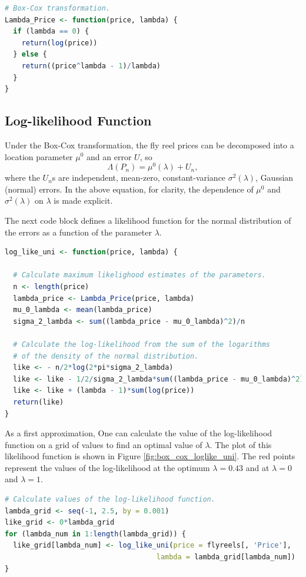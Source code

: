 \vspace{1.0in}

\begin{lstlisting}[language=R]
# Box-Cox transformation.
Lambda_Price <- function(price, lambda) {
  if (lambda == 0) {
    return(log(price))
  } else {
    return((price^lambda - 1)/lambda)
  }
}
\end{lstlisting}

\pagebreak
\subsection{Log-likelihood Function}

Under the Box-Cox transformation,
the fly reel prices can be decomposed into a location parameter $\mu^0$ 
and an error $U$, so
$$\Lambda(P_n) = \mu^0(\lambda) + U_n,$$
where the $U_n$s are independent, mean-zero, constant-variance 
$\sigma^2(\lambda)$, Gaussian (normal) errors. 
In the above equation, for clarity, the dependence of $\mu^0$ and 
$\sigma^2(\lambda)$ on $\lambda$ is made explicit.


The next code block defines a likelihood function for the normal distribution of the errors
as a function of the parameter $\lambda$.

\begin{lstlisting}[language=R]
log_like_uni <- function(price, lambda) {

  # Calculate maximum likelighood estimates of the parameters.
  n <- length(price)
  lambda_price <- Lambda_Price(price, lambda)
  mu_0_lambda <- mean(lambda_price)
  sigma_2_lambda <- sum((lambda_price - mu_0_lambda)^2)/n

  # Calculate the log-likelihood from the sum of the logarithms
  # of the density of the normal distribution.
  like <- - n/2*log(2*pi*sigma_2_lambda)
  like <- like - 1/2/sigma_2_lambda*sum((lambda_price - mu_0_lambda)^2)
  like <- like + (lambda - 1)*sum(log(price))
  return(like)
}
\end{lstlisting}

\pagebreak
As a first approximation, 
One can calculate the value of the log-likelihood function on a grid of values
to find an optimal value of $\lambda$.
The plot of this likelihood function is shown in Figure \ref{fig:box_cox_loglike_uni}.
The red points represent the values of the log-likelihood 
at the optimum $\lambda = 0.43$ and at $\lambda = 0$ and $\lambda = 1$.

\begin{lstlisting}[language=R]
# Calculate values of the log-likelihood function.
lambda_grid <- seq(-1, 2.5, by = 0.001)
like_grid <- 0*lambda_grid
for (lambda_num in 1:length(lambda_grid)) {
  like_grid[lambda_num] <- log_like_uni(price = flyreels[, 'Price'],
                                    lambda = lambda_grid[lambda_num])
}
\end{lstlisting}

